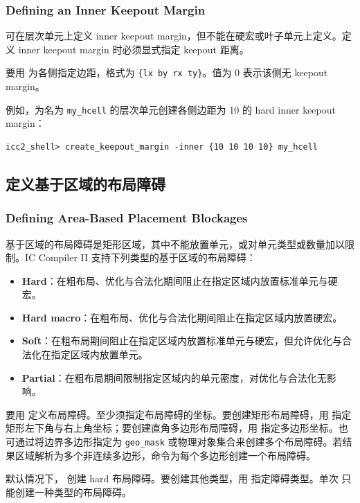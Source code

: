 \subsubsection*{Defining an Inner Keepout Margin}

可在层次单元上定义 inner keepout margin，但不能在硬宏或叶子单元上定义。定义 inner keepout margin 时必须显式指定 keepout 距离。

要用  为各侧指定边距，格式为 \texttt{\{lx by rx ty\}}。值为 0 表示该侧无 keepout margin。

例如，为名为 \texttt{my\_hcell} 的层次单元创建各侧边距为 10 的 hard inner keepout margin：
\begin{lstlisting}
icc2_shell> create_keepout_margin -inner {10 10 10 10} my_hcell
\end{lstlisting}

\subsection{定义基于区域的布局障碍}
\subsubsection*{Defining Area-Based Placement Blockages}

基于区域的布局障碍是矩形区域，其中不能放置单元，或对单元类型或数量加以限制。IC Compiler II 支持下列类型的基于区域的布局障碍：
\begin{itemize}
  \item \textbf{Hard}：在粗布局、优化与合法化期间阻止在指定区域内放置标准单元与硬宏。
  \item \textbf{Hard macro}：在粗布局、优化与合法化期间阻止在指定区域内放置硬宏。
  \item \textbf{Soft}：在粗布局期间阻止在指定区域内放置标准单元与硬宏，但允许优化与合法化在指定区域内放置单元。
  \item \textbf{Partial}：在粗布局期间限制指定区域内的单元密度，对优化与合法化无影响。
\end{itemize}

要用  定义布局障碍。至少须指定布局障碍的坐标。要创建矩形布局障碍，用  指定矩形左下角与右上角坐标；要创建直角多边形布局障碍，用  指定多边形坐标。也可通过将边界多边形指定为 \texttt{geo\_mask} 或物理对象集合来创建多个布局障碍。若结果区域解析为多个非连续多边形，命令为每个多边形创建一个布局障碍。

默认情况下， 创建 hard 布局障碍。要创建其他类型，用  指定障碍类型。单次  只能创建一种类型的布局障碍。


